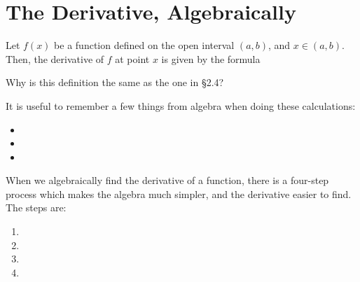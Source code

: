 \documentclass[notes]{subfiles}
\begin{document}
	\fancyhead[LO,RE]{\bfseries  \currentname}
	\fancyfoot[C]{{}}
	\fancyfoot[RO,LE]{\large \thepage}	%


\section*{The Derivative, Algebraically}\label{cs25}
	\begin{defn}
		Let $f(x)$ be a function defined on the open interval $(a,b)$, and $x\in (a,b)$.  Then, the derivative of $f$ at point $x$ is given by the formula
	\end{defn}

	\begin{question}
		Why is this definition the same as the one in \S2.4?
	\end{question}
		
	It is useful to remember a few things from algebra when doing these calculations: 
	
	\begin{itemize}
		\item {}
		\item {}
		\item {}
	\end{itemize}
		
	When we algebraically find the derivative of a function, there is a four-step process which makes the algebra much simpler, and the derivative easier to find.  The steps are:\\
	\begin{enumerate}
		\item {}
		\item {}
		\item {}
		\item {}
	\end{enumerate}
		
\end{document}
